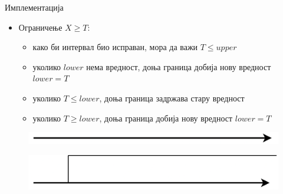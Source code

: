 \documentclass[xcolor=table]{beamer}
\begin{document}
\begin{frame}[allowframebreaks]{Имплементација}
        \begin{itemize}
            \item Ограничење \begin{math}X \geq T\end{math}:
            \begin{itemize}
                \item како би интервал био исправан, мора да важи \begin{math}T \leq upper\end{math}
                \item уколико \begin{math}lower\end{math} нема вредност, доња граница добија нову вредност \begin{math}lower = T\end{math}
                \item уколико \begin{math}T \leq lower\end{math}, доња граница задржава стару вредност
                \item уколико \begin{math}T \geq lower\end{math}, доња граница добија нову вредност \begin{math}lower = T\end{math}
            \end{itemize}
        \end{itemize}
        
        \framebreak
        
        \begin{figure}
            \centering
            \includegraphics[width=\textwidth,height=0.8\textheight,keepaspectratio]{images/uni_int0.png}
        \end{figure}
        
        \framebreak
        
        \begin{figure}
            \centering
            \includegraphics[width=\textwidth,height=0.8\textheight,keepaspectratio]{images/uni_int1.png}
        \end{figure}
        

\end{frame}
\end{document}
